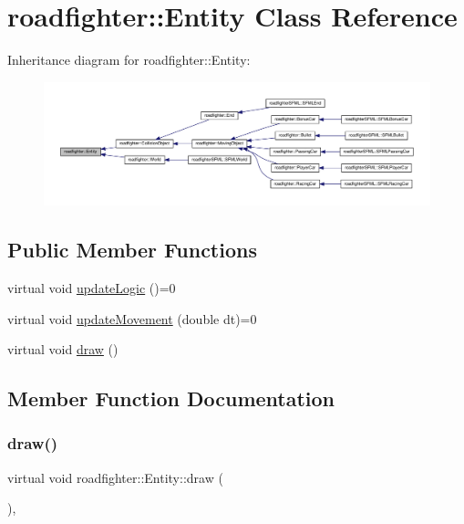 \hypertarget{classroadfighter_1_1Entity}{}\section{roadfighter\+:\+:Entity Class Reference}
\label{classroadfighter_1_1Entity}


Inheritance diagram for roadfighter\+:\+:Entity\+:
\nopagebreak
\begin{figure}[H]
\begin{center}
\leavevmode
\includegraphics[width=350pt]{classroadfighter_1_1Entity__inherit__graph}
\end{center}
\end{figure}
\subsection*{Public Member Functions}
\begin{DoxyCompactItemize}
\item 
virtual void \hyperlink{classroadfighter_1_1Entity_a54c00f1af306290bae3e4b84e196566b}{update\+Logic} ()=0
\item 
virtual void \hyperlink{classroadfighter_1_1Entity_a66614a11004d6f9516473f60b530f689}{update\+Movement} (double dt)=0
\item 
virtual void \hyperlink{classroadfighter_1_1Entity_a30caeaac440c67460ea311f9b1bf3552}{draw} ()
\end{DoxyCompactItemize}


\subsection{Member Function Documentation}
\mbox{\label{classroadfighter_1_1Entity_a30caeaac440c67460ea311f9b1bf3552}} 
\subsubsection{\texorpdfstring{draw()}{draw()}}
{\footnotesize\ttfamily virtual void roadfighter\+::\+Entity\+::draw (\begin{DoxyParamCaption}{ }\end{DoxyParamCaption})\hspace{0.3cm}{\ttfamily [inline]}, {\ttfamily [virtual]}}

